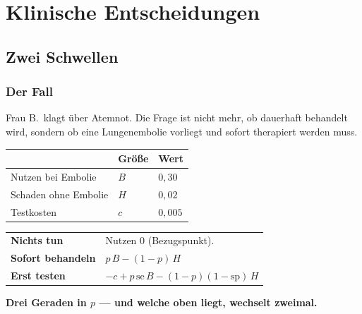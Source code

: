 \part{Klinische Entscheidungen}

\chapter{Zwei Schwellen}

\section{Der Fall}

\begin{merksatz}
Frau B.\ klagt über Atemnot. Die Frage ist nicht mehr, ob dauerhaft behandelt wird, sondern ob  eine Lungenembolie vorliegt und sofort therapiert werden muss.

\begin{center}
{\small
\renewcommand{\arraystretch}{1.5}
\begin{tabular}{@{}P{3.0cm}P{2.2cm}P{2.6cm}@{}}
\toprule
& \textbf{Größe} & \textbf{Wert}\\
\midrule
Nutzen bei Embolie & $B$ & $0{,}30$\\
Schaden ohne Embolie & $H$ & $0{,}02$\\
Testkosten & $c$ & $0{,}005$\\
\bottomrule
\end{tabular}}
\end{center}
\end{merksatz}

\begin{merksatz}
\begin{center}
{\small
\renewcommand{\arraystretch}{1.55}
\begin{tabular}{@{}P{2.4cm}P{6.2cm}@{}}
\toprule
\textbf{Nichts tun} & Nutzen $0$ (Bezugspunkt).\\
\textbf{Sofort behandeln} & $p\,B - (1-p)\,H$\\
\textbf{Erst testen} & $-c + p\,\text{se}\,B - (1-p)(1-\text{sp})\,H$\\
\bottomrule
\end{tabular}}
\end{center}

\begin{center}
\begin{minipage}{0.9\textwidth}
\textbf{Drei Geraden in $p$ --- und welche oben liegt, wechselt zweimal.}
\end{minipage}
\end{center}
\end{merksatz}

